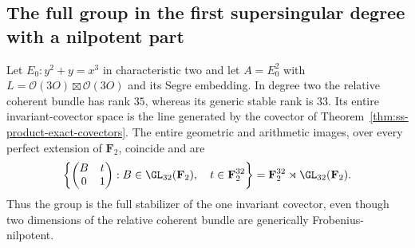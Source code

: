 \subsection{The full group in the first supersingular degree with a nilpotent part}
\label{subsec:ss-product-degree-two-full}

\begin{theorem}\label{thm:ss-product-degree-two-full-group}
Let $E_0:y^2+y=x^3$ in characteristic two and let
$A=E_0^2$ with $L=\mathcal O(3O)\boxtimes\mathcal O(3O)$ and its Segre
embedding. In degree two the relative coherent bundle has rank $35$,
whereas its generic stable rank is $33$. Its entire invariant-covector
space is the line generated by the covector of
Theorem~\ref{thm:ss-product-exact-covectors}.
The entire geometric and arithmetic images, over every perfect extension
of $\mathbf F_2$, coincide and are
\[
 \left\{\begin{pmatrix}B&t\\0&1\end{pmatrix}:
 B\in\GL_{32}(\mathbf F_2),\quad t\in\mathbf F_2^{32}\right\}
       =\mathbf F_2^{32}\rtimes\GL_{32}(\mathbf F_2).
\]
Thus the group is the full stabilizer of the one invariant covector,
even though two dimensions of the relative coherent bundle are generically
Frobenius-nilpotent.
\end{theorem}
